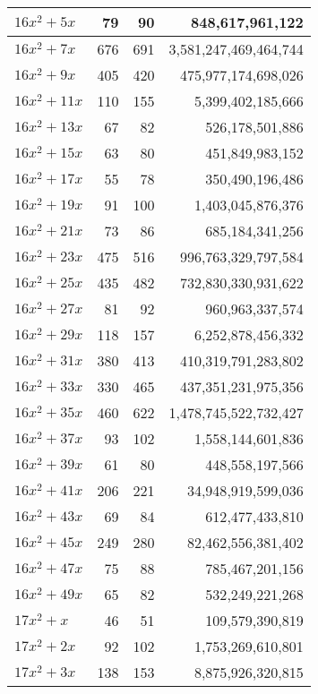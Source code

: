 \documentclass[a4paper]{amsproc}
\theoremstyle{plain}
\begin{document}
\begin{longtable}{ | l | r | r | r | }
$16x^2 + 5x$ & 79 & 90 & 848{,}617{,}961{,}122 \\ \hline
$16x^2 + 7x$ & 676 & 691 & 3{,}581{,}247{,}469{,}464{,}744 \\ \hline
$16x^2 + 9x$ & 405 & 420 & 475{,}977{,}174{,}698{,}026 \\ \hline
$16x^2 + 11x$ & 110 & 155 & 5{,}399{,}402{,}185{,}666 \\ \hline
$16x^2 + 13x$ & 67 & 82 & 526{,}178{,}501{,}886 \\ \hline
$16x^2 + 15x$ & 63 & 80 & 451{,}849{,}983{,}152 \\ \hline
$16x^2 + 17x$ & 55 & 78 & 350{,}490{,}196{,}486 \\ \hline
$16x^2 + 19x$ & 91 & 100 & 1{,}403{,}045{,}876{,}376 \\ \hline
$16x^2 + 21x$ & 73 & 86 & 685{,}184{,}341{,}256 \\ \hline
$16x^2 + 23x$ & 475 & 516 & 996{,}763{,}329{,}797{,}584 \\ \hline
$16x^2 + 25x$ & 435 & 482 & 732{,}830{,}330{,}931{,}622 \\ \hline
$16x^2 + 27x$ & 81 & 92 & 960{,}963{,}337{,}574 \\ \hline
$16x^2 + 29x$ & 118 & 157 & 6{,}252{,}878{,}456{,}332 \\ \hline
$16x^2 + 31x$ & 380 & 413 & 410{,}319{,}791{,}283{,}802 \\ \hline
$16x^2 + 33x$ & 330 & 465 & 437{,}351{,}231{,}975{,}356 \\ \hline
$16x^2 + 35x$ & 460 & 622 & 1{,}478{,}745{,}522{,}732{,}427 \\ \hline
$16x^2 + 37x$ & 93 & 102 & 1{,}558{,}144{,}601{,}836 \\ \hline
$16x^2 + 39x$ & 61 & 80 & 448{,}558{,}197{,}566 \\ \hline
$16x^2 + 41x$ & 206 & 221 & 34{,}948{,}919{,}599{,}036 \\ \hline
$16x^2 + 43x$ & 69 & 84 & 612{,}477{,}433{,}810 \\ \hline
$16x^2 + 45x$ & 249 & 280 & 82{,}462{,}556{,}381{,}402 \\ \hline
$16x^2 + 47x$ & 75 & 88 & 785{,}467{,}201{,}156 \\ \hline
$16x^2 + 49x$ & 65 & 82 & 532{,}249{,}221{,}268 \\ \hline
$17x^2 + x$ & 46 & 51 & 109{,}579{,}390{,}819 \\ \hline
$17x^2 + 2x$ & 92 & 102 & 1{,}753{,}269{,}610{,}801 \\ \hline
$17x^2 + 3x$ & 138 & 153 & 8{,}875{,}926{,}320{,}815 \\ \hline

\end{longtable}
\end{document}
